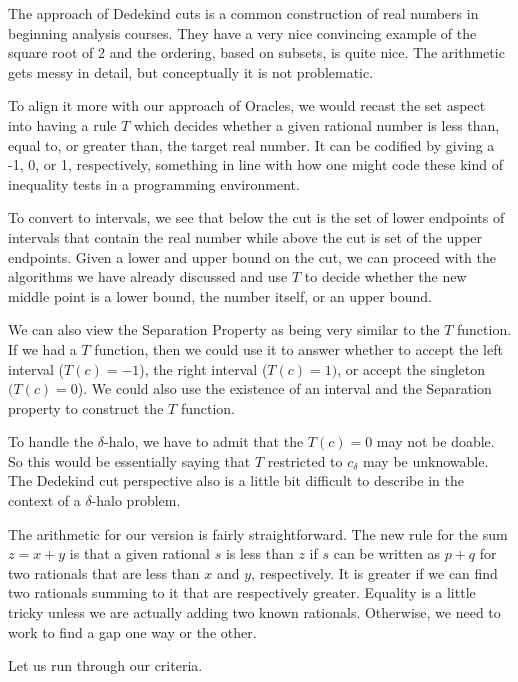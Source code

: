 \documentclass[12pt]{article}
\begin{document}
The approach of Dedekind cuts is a common construction of real numbers in beginning analysis courses. They have a very nice convincing example of the square root of 2 and the ordering, based on subsets, is quite nice. The arithmetic gets messy in detail, but conceptually it is not problematic. 

To align it more with our approach of Oracles, we would recast the set aspect into having a rule $T$ which decides whether a given rational number is less than, equal to, or greater than, the target real number. It can be codified by giving a -1, 0, or 1,  respectively, something in line with how one might code these kind of inequality tests in a programming environment. 

To convert to intervals, we see that below the cut is the set of lower endpoints of intervals that contain the real number while above the cut is set of the upper endpoints. Given a lower and upper bound on the cut, we can proceed with the algorithms we have already discussed and use $T$ to decide whether the new middle point is a lower bound, the number itself, or an upper bound. 

We can also view the Separation Property as being very similar to the $T$ function. If we had a $T$ function, then we could use it to answer whether to accept the left interval ($T(c) = -1$), the right interval ($T(c)=1)$, or accept the singleton $(T(c) = 0$). We could also use the existence of an interval and the Separation property to construct the $T$ function.

To handle the $\delta$-halo, we have to admit that the $T(c)=0$ may not be doable. So this would be essentially saying that $T$ restricted to $c_\delta$ may be unknowable. The Dedekind cut perspective also is a little bit difficult to describe in the context of a $\delta$-halo problem. 

The arithmetic for our version is fairly straightforward. The new rule for the sum  $z = x+y$ is that a given rational $s$ is less than $z$ if $s$ can be written as $p+q$ for two rationals that are less than $x$ and $y$, respectively. It is greater if we can find two rationals summing to it that are respectively greater. Equality is a little tricky unless we are actually adding two known rationals. Otherwise, we need to work to find a gap one way or the other. 

Let us run through our criteria. 
\end{document}
